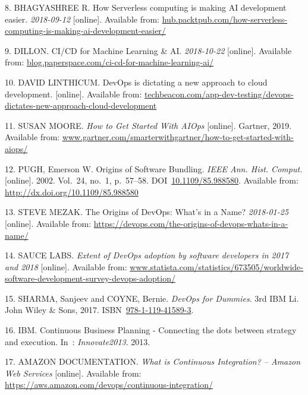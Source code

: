 \documentclass[12pt,english,a4paper,oneside,,tablecaptionabove]{scrbook}
\begin{document}
\leavevmode\hypertarget{ref-BhagyashreeR}{}%
8. BHAGYASHREE R. How Serverless computing is making AI development
easier. \emph{2018-09-12} {[}online{]}. Available from:
\url{hub.packtpub.com/how-serverless-computing-is-making-ai-development-easier/}

\leavevmode\hypertarget{ref-Dillon}{}%
9. DILLON. CI/CD for Machine Learning \& AI. \emph{2018-10-22}
{[}online{]}. Available from:
\url{blog.paperspace.com/ci-cd-for-machine-learning-ai/}

\leavevmode\hypertarget{ref-DavidLinthicum}{}%
10. DAVID LINTHICUM. DevOps is dictating a new approach to cloud
development. {[}online{]}. Available from:
\url{techbeacon.com/app-dev-testing/devops-dictates-new-approach-cloud-development}

\leavevmode\hypertarget{ref-SusanMoore2019}{}%
11. SUSAN MOORE. \emph{How to Get Started With AIOps} {[}online{]}.
Gartner, 2019. Available from:
\url{www.gartner.com/smarterwithgartner/how-to-get-started-with-aiops/}

\leavevmode\hypertarget{ref-Pugh:2002:OSB:513126.513131}{}%
12. PUGH, Emerson W. Origins of Software Bundling. \emph{IEEE Ann. Hist.
Comput.} {[}online{]}. 2002. Vol.~24, no.~1, p.~57--58.
DOI~\href{https://doi.org/10.1109/85.988580}{10.1109/85.988580}.
Available from: \url{http://dx.doi.org/10.1109/85.988580}

\leavevmode\hypertarget{ref-SteveMezak}{}%
13. STEVE MEZAK. The Origins of DevOps: What's in a Name?
\emph{2018-01-25} {[}online{]}. Available from:
\url{https://devops.com/the-origins-of-devops-whats-in-a-name/}

\leavevmode\hypertarget{ref-SauceLabs}{}%
14. SAUCE LABS. \emph{Extent of DevOps adoption by software developers
in 2017 and 2018} {[}online{]}. Available from:
\url{www.statista.com/statistics/673505/worldwide-software-development-survey-devops-adoption/}

\leavevmode\hypertarget{ref-Sharma2017}{}%
15. SHARMA, Sanjeev and COYNE, Bernie. \emph{DevOps for Dummies}. 3rd
IBM Li. John Wiley \& Sons, 2017.
ISBN~\href{https://worldcat.org/isbn/978-1-119-41589-3}{978-1-119-41589-3}.

\leavevmode\hypertarget{ref-IBM2013}{}%
16. IBM. Continuous Business Planning - Connecting the dots between
strategy and execution. In~: \emph{Innovate2013}. 2013.

\leavevmode\hypertarget{ref-AmazonDocumentation}{}%
17. AMAZON DOCUMENTATION. \emph{What is Continuous Integration? --
Amazon Web Services} {[}online{]}. Available from:
\url{https://aws.amazon.com/devops/continuous-integration/}
\end{document}
